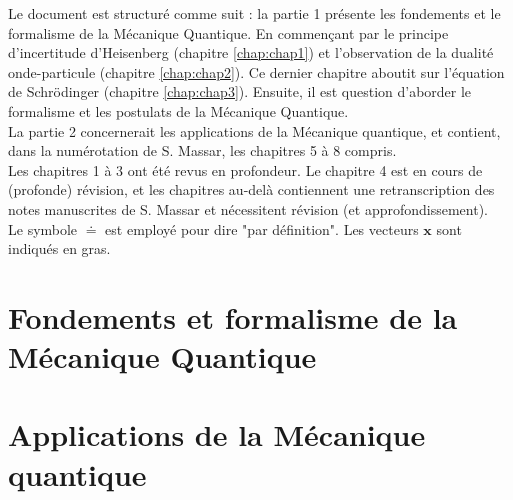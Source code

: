 \documentclass{book}
\numberwithin{equation}{part}
\begin{document}
Le document est structuré comme suit : la partie 1 présente les fondements et le formalisme de la Mécanique Quantique. En commençant par le principe d'incertitude d'Heisenberg (chapitre \ref{chap:chap1}) et l'observation de la dualité onde-particule (chapitre \ref{chap:chap2}). Ce dernier chapitre aboutit sur l'équation de Schrödinger (chapitre \ref{chap:chap3}). Ensuite, il est question d'aborder le formalisme et les postulats de la Mécanique Quantique. \\

La partie 2 concernerait les applications de la Mécanique quantique, et contient, dans la numérotation de S. Massar, les chapitres 5 à 8 compris. \\

Les chapitres 1 à 3 ont été revus en profondeur. Le chapitre 4 est en cours de (profonde) révision, et les chapitres au-delà contiennent une retranscription des notes manuscrites de S. Massar et nécessitent révision (et approfondissement). \\

Le symbole $\doteq$ est employé pour dire "par définition". Les vecteurs $\bm{x}$ sont indiqués en gras.


\newpage
\tableofcontents

\part{Fondements et formalisme de la Mécanique Quantique}
\newpage
\newpage
\newpage
\newpage

\part{Applications de la Mécanique quantique}

\newpage
\newpage

\newpage
\end{document}
